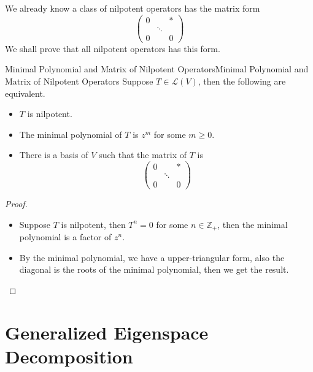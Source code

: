 \documentclass[../main.tex]{subfiles}
\begin{document}
\begin{remark}
We already know a class of nilpotent operators has the matrix form
\begin{equation*}
\begin{pmatrix}
	0&&*\\
	 &\ddots &\\
	0&&0
\end{pmatrix}
\end{equation*}
We shall prove that all nilpotent operators has this form.
\end{remark}

\begin{theorem}{Minimal Polynomial and Matrix of Nilpotent Operators}{Minimal Polynomial and Matrix of Nilpotent Operators}
Suppose $T\in \mathscr{L}(V)$, then the following are equivalent.
\begin{itemize}
\item $T$ is nilpotent.
\item The minimal polynomial of $T$ is $z^m$ for some $m \geq 0$.
\item There is a basis of $V$ such that the matrix of $T$ is
\begin{equation*}
\begin{pmatrix}
	0&&*\\
	 &\ddots &\\
	0&&0
\end{pmatrix}
\end{equation*}
\end{itemize}
\end{theorem}
\begin{proof}
\begin{itemize}
\item Suppose $T$ is nilpotent, then $T^n=0$ for some $n\in \mathbb{Z}_+$, then the minimal polynomial is a factor of $z^n$.
\item By the minimal polynomial, we have a upper-triangular form, also the diagonal is the roots of the minimal polynomial, then we get the result.
\end{itemize}
\end{proof}

\section{Generalized Eigenspace Decomposition}
\end{document}

